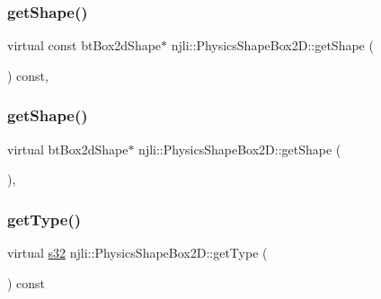 \subsubsection{\texorpdfstring{get\+Shape()}{getShape()}\hspace{0.1cm}{\footnotesize\ttfamily [1/2]}}
{\footnotesize\ttfamily virtual const bt\+Box2d\+Shape$\ast$ njli\+::\+Physics\+Shape\+Box2\+D\+::get\+Shape (\begin{DoxyParamCaption}{ }\end{DoxyParamCaption}) const\hspace{0.3cm}{\ttfamily [protected]}, {\ttfamily [virtual]}}

\mbox{\label{classnjli_1_1_physics_shape_box2_d_a88fc80b2bd00f7615c50e19322acd612}} 
\subsubsection{\texorpdfstring{get\+Shape()}{getShape()}\hspace{0.1cm}{\footnotesize\ttfamily [2/2]}}
{\footnotesize\ttfamily virtual bt\+Box2d\+Shape$\ast$ njli\+::\+Physics\+Shape\+Box2\+D\+::get\+Shape (\begin{DoxyParamCaption}{ }\end{DoxyParamCaption})\hspace{0.3cm}{\ttfamily [protected]}, {\ttfamily [virtual]}}

\mbox{\label{classnjli_1_1_physics_shape_box2_d_a1fd8c07d99fd3cbd64a94c3030c0d5d5}} 
\subsubsection{\texorpdfstring{get\+Type()}{getType()}}
{\footnotesize\ttfamily virtual \mbox{\hyperlink{_util_8h_aa62c75d314a0d1f37f79c4b73b2292e2}{s32}} njli\+::\+Physics\+Shape\+Box2\+D\+::get\+Type (\begin{DoxyParamCaption}{ }\end{DoxyParamCaption}) const\hspace{0.3cm}{\ttfamily [virtual]}}

